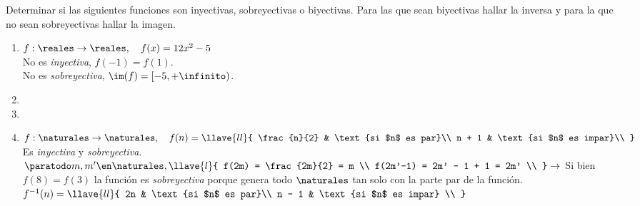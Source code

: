 \ejercicio
Determinar si las siguientes funciones son inyectivas, sobreyectivas o biyectivas. Para las que sean biyectivas hallar la inversa y para la que no sean sobreyectivas hallar la imagen.\\
\begin{enumerate}[label=\roman*)]
	\item $f: \reales \to \reales,\quad f(x) = 12 x^2 - 5$\\
	      No es \textit{inyectiva}, $f(-1) = f(1)$.\\
	      No es \textit{sobreyectiva}, $\im(f) = [-5, +\infinito)$.
	\item \hacer

	\item \hacer

	\item $f: \naturales \to \naturales,\quad
		      f(n) = \llave{ll}{
			      \frac{n}{2} & \text{si $n$ es par}\\
			      n + 1 & \text{si $n$ es impar}\\
		      }$\\
	      Es \textit{inyectiva} y \textit{sobreyectiva}. $\paratodo m,m' \en \naturales,
		      \llave{l}{
			      f(2m) = \frac{2m}{2} = m \\
			      f(2m'-1) = 2m' - 1 + 1 = 2m' \\
		      } \to$ Si bien $f(8) = f(3)$ la función es \textit{sobreyectiva} porque
	      genera todo $\naturales$ tan solo con la parte par de la función.\\
	      $f^{-1}(n) =
		      \llave{ll}{
			      2n    & \text{si $n$ es par}\\
			      n - 1 & \text{si $n$ es impar} \\
		      }$\\

\end{enumerate}
